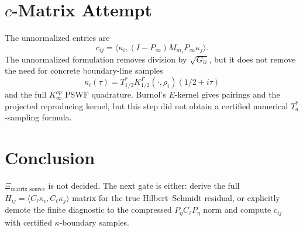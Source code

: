 \documentclass[11pt]{article}
\begin{document}
\section*{\(c\)-Matrix Attempt}

The unnormalized entries are
\[
c_{ij}=\langle\kappa_i,(I-P_\infty)M_{m_\ell}P_\infty\kappa_j\rangle.
\]
The unnormalized formulation removes division by \(\sqrt{G_{ii}}\), but it
does not remove the need for concrete boundary-line samples
\[
\kappa_i(\tau)=T_{1/2}^*K_{1/2}^{\Gamma}(\cdot,\rho_i)(1/2+i\tau)
\]
and the full \(K_\infty^{op}\) PSWF quadrature.  Burnol's \(E\)-kernel gives
pairings and the projected reproducing kernel, but this step did not obtain a
certified numerical \(T_a^*\)-sampling formula.

\section*{Conclusion}

\(\Xi_{\mathrm{matrix\_source}}\) is not decided.  The next gate is either:
derive the full \(H_{ij}=\langle C_\ell\kappa_i,C_\ell\kappa_j\rangle\) matrix
for the true Hilbert--Schmidt residual, or explicitly demote the finite
diagnostic to the compressed \(P_\eta C_\ell P_\eta\) norm and compute
\(c_{ij}\) with certified \(\kappa\)-boundary samples.
\end{document}
